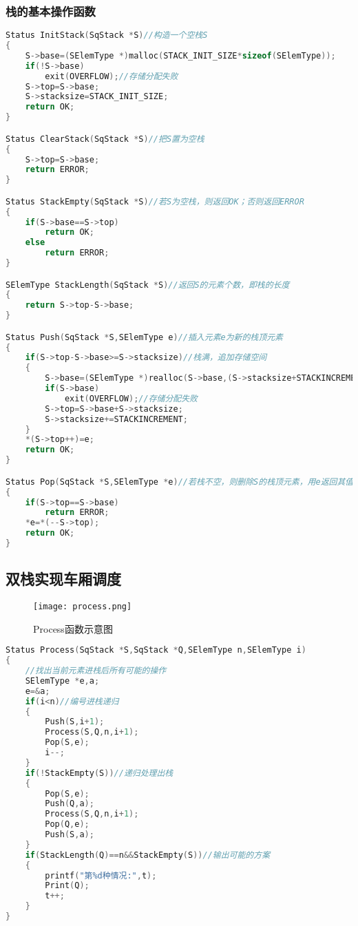 \documentclass{DateStructure}
\begin{document}
\subsubsection{栈的基本操作函数}
\begin{lstlisting}[language=C,caption={栈的操作函数}]
Status InitStack(SqStack *S)//构造一个空栈S
{
    S->base=(SElemType *)malloc(STACK_INIT_SIZE*sizeof(SElemType));
    if(!S->base)
        exit(OVERFLOW);//存储分配失败
    S->top=S->base;
    S->stacksize=STACK_INIT_SIZE;
    return OK;
}

Status ClearStack(SqStack *S)//把S置为空栈
{
	S->top=S->base;
	return ERROR;
}

Status StackEmpty(SqStack *S)//若S为空栈，则返回OK；否则返回ERROR
{
	if(S->base==S->top)
		return OK;
	else
		return ERROR;		
}

SElemType StackLength(SqStack *S)//返回S的元素个数，即栈的长度
{
	return S->top-S->base;
}

Status Push(SqStack *S,SElemType e)//插入元素e为新的栈顶元素
{
	if(S->top-S->base>=S->stacksize)//栈满，追加存储空间
	{
		S->base=(SElemType *)realloc(S->base,(S->stacksize+STACKINCREMENT)*sizeof(SElemType));
		if(S->base)
			exit(OVERFLOW);//存储分配失败
		S->top=S->base+S->stacksize;
		S->stacksize+=STACKINCREMENT;	 
	}
	*(S->top++)=e;
	return OK;
}

Status Pop(SqStack *S,SElemType *e)//若栈不空，则删除S的栈顶元素，用e返回其值，并返回OK；否则返回ERROR
{
    if(S->top==S->base)
        return ERROR;
    *e=*(--S->top);
    return OK;
}
\end{lstlisting}
\subsection{双栈实现车厢调度}
\begin{figure}[H] 
\centering
\texttt{[image: process.png]}
\caption{Process函数示意图}
\end{figure}
\begin{lstlisting}[language=C,caption={车厢调度函数}]
Status Process(SqStack *S,SqStack *Q,SElemType n,SElemType i)
{
    //找出当前元素进栈后所有可能的操作
    SElemType *e,a;
    e=&a;
    if(i<n)//编号进栈递归 
    {
        Push(S,i+1);
        Process(S,Q,n,i+1);
        Pop(S,e);
        i--;
    }
    if(!StackEmpty(S))//递归处理出栈
    {
        Pop(S,e);
        Push(Q,a);
        Process(S,Q,n,i+1);
        Pop(Q,e);
        Push(S,a);
    }
    if(StackLength(Q)==n&&StackEmpty(S))//输出可能的方案
    {
        printf("第%d种情况:",t);
        Print(Q);
        t++;
    }
}
\end{lstlisting}
\end{document}
